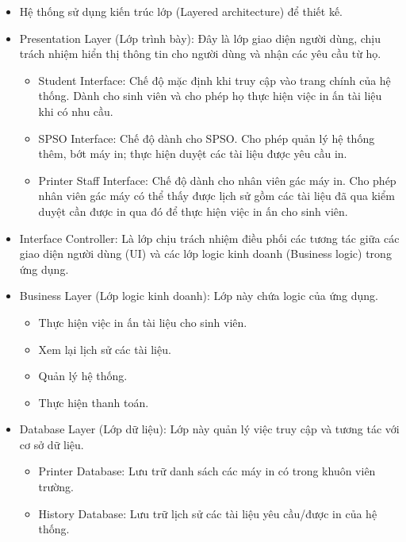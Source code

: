 \begin{itemize}
\item Hệ thống sử dụng kiến trúc lớp (Layered architecture) để thiết kế.
\item Presentation Layer (Lớp trình bày): Đây là lớp giao diện người dùng, chịu trách nhiệm hiển thị thông tin cho người dùng và nhận các yêu cầu từ họ.\par    
\begin{itemize}
\item Student Interface: Chế độ mặc định khi truy cập vào trang chính của hệ thống. Dành cho sinh viên và cho phép họ thực hiện việc in ấn tài liệu khi có nhu cầu. 
\item SPSO Interface: Chế độ dành cho SPSO. Cho phép quản lý hệ thống thêm, bớt máy in; thực hiện duyệt các tài liệu được yêu cầu in.  \par
\item Printer Staff Interface: Chế độ dành cho nhân viên gác máy in. Cho phép nhân viên gác máy có thể thấy được lịch sử gồm các tài liệu đã qua kiểm duyệt cần được in qua đó để thực hiện việc in ấn cho sinh viên.  \par

\end{itemize}
\item Interface Controller: Là lớp chịu trách nhiệm điều phối các tương tác giữa các giao diện người dùng (UI) và các lớp logic kinh doanh (Business logic) trong ứng dụng.\par


\item Business Layer (Lớp logic kinh doanh): Lớp này chứa logic của ứng dụng. \par   

\begin{itemize}
\item Thực hiện việc in ấn tài liệu cho sinh viên. \par
\item Xem lại lịch sử các tài liệu.\par
\item Quản lý hệ thống.\par
\item Thực hiện thanh toán.\par

\end{itemize}
\item Database Layer (Lớp dữ liệu): Lớp này quản lý việc truy cập và tương tác với cơ sở dữ liệu.\par    
\begin{itemize}
\item Printer Database: Lưu trữ danh sách các máy in có trong khuôn viên trường. 
\item History Database: Lưu trữ lịch sử các tài liệu yêu cầu/được in của hệ thống. \par


\end{itemize}
\end{itemize}
